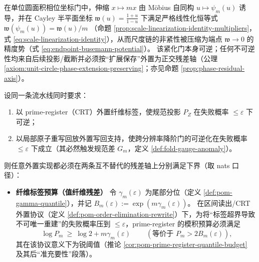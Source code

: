 \begin{theorem}[结论 A：双残差预算下界与可逆实现的二分相图]\label{thm:unit-circle-phase-double-residual-budget}
在单位圆面积相位坐标门中，伸缩 \(x\mapsto mx\) 由 Möbius 自同构 \(u\mapsto\psi_m(u)\) 诱导，并在 Cayley 半平面坐标 \(\mathfrak{w}(u)=\frac{1+u}{1-u}\) 下满足严格线性化恒等式
\(
\mathfrak{w}(\psi_m(u))=\mathfrak{w}(u)/m
\)
（命题 \ref{prop:scale-linearization-identity-multipliers}，式 \eqref{eq:scale-linearization-identity}），从而尺度链的非紧性被压缩为端点 \(\mathfrak{w}\to 0\) 的精度势（式 \eqref{eq:endpoint-busemann-potential}）。
该紧化门本身可逆；任何不可逆性均来自后续投影/截断并必须按“扩展保存”外置为正交残差轴（公理 \ref{axiom:unit-circle-phase-extension-preserving}；亦见命题 \ref{prop:phase-residual-axis}）。

设同一条流水线同时要求：
\begin{enumerate}
  \item 以 prime-register（CRT）外置纤维标签，使规范投影 \(P_Z\) 在失败概率 \(\le\varepsilon\) 下可逆；
  \item 以局部原子重写回放外置写回支持，使跨分辨率降阶门的可逆化在失败概率 \(\le\varepsilon\) 下成立（其必然触发规范差 \(G_m\)，定义 \ref{def:fold-gauge-anomaly}）。
\end{enumerate}
则任意外置实现都必须在两条互不替代的残差轴上分别满足下界（取 nats 口径）：
\begin{itemize}
  \item \textbf{纤维标签预算（值纤维残差）} 令 \(\gamma_m(\varepsilon)\) 为尾部分位（定义 \ref{def:pom-gamma-quantile}），并记
  \(B_m(\varepsilon):=\exp(m\gamma_m(\varepsilon))\)。
  在区间读出/CRT 外置协议（定义 \ref{def:pom-order-elimination-rewrite}）下，为将“标签超界导致不可唯一重建”的失败概率压到 \(\le\varepsilon\)，prime-register 的模积预算必须满足
  \[
  \boxed{\ \log P_m\ \ge\ \log 2+m\gamma_m(\varepsilon)\ }
  \qquad(\text{等价于 }P_m>2B_m(\varepsilon)),
  \]
  其在该协议意义下为锐阈值（推论 \ref{cor:pom-prime-register-quantile-budget} 及其后“准充要性”段落）。


\end{itemize}
\end{theorem}
